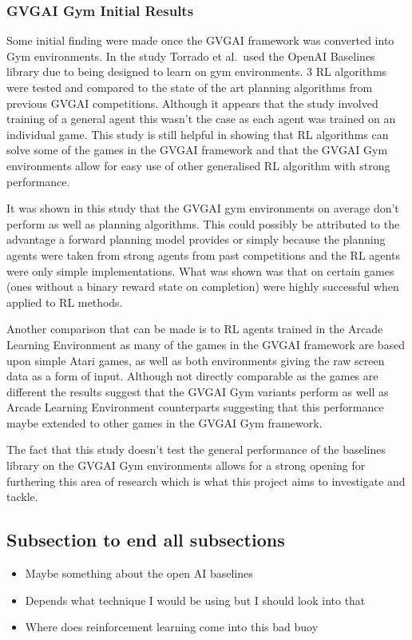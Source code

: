 \documentclass[a4paper]{article}
\begin{document}
\subsubsection{GVGAI Gym Initial Results}
Some initial finding were made once the GVGAI framework was converted into Gym environments.
In the study Torrado et al.\ used the OpenAI Baselines\cite{baselines} library due to being designed to learn on gym environments.
3 RL algorithms were tested and compared to the state of the art planning algorithms from previous GVGAI competitions\cite{GVGAIGYM}.
Although it appears that the study involved training of a general agent this wasn't the case as each agent was trained on an individual game.
This study is still helpful in showing that RL algorithms can solve some of the games in the GVGAI framework and that the GVGAI Gym environments allow for easy use of other generalised RL algorithm with strong performance.
\par
It was shown in this study that the GVGAI gym environments on average don't perform as well as planning algorithms.
This could possibly be attributed to the advantage a forward planning model provides or simply because the planning agents were taken from strong agents from past competitions and the RL agents were only simple implementations.
What was shown was that on certain games (ones without a binary reward state on completion) were highly successful when applied to RL methods.
\par
Another comparison that can be made is to RL agents trained in the Arcade Learning Environment as many of the games in the GVGAI framework are based upon simple Atari games, as well as both environments giving the raw screen data as a form of input\cite{ALE}.
Although not directly comparable as the games are different the results suggest that the GVGAI Gym variants perform as well as Arcade Learning Environment counterparts suggesting that this performance maybe extended to other games in the GVGAI Gym framework.
\par
The fact that this study doesn't test the general performance of the baselines library on the GVGAI Gym environments allows for a strong opening for furthering this area of research which is what this project aims to investigate and tackle.

\subsection{Subsection to end all subsections}
\begin{itemize}
    \item Maybe something about the open AI baselines
    \item Depends what technique I would be using but I should look into that
    \item Where does reinforcement learning come into this bad buoy
\end{itemize}
\end{document}
